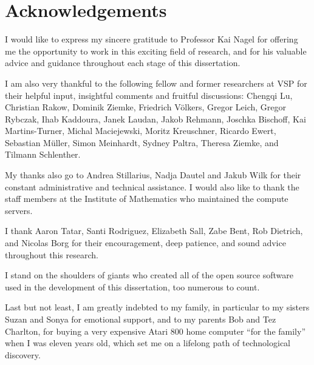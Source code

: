 
\thispagestyle{empty}

\chapter*{Acknowledgements}


I would like to express my sincere gratitude to Professor Kai Nagel for offering me the opportunity to work in this exciting field of research, and for his valuable advice and guidance throughout each stage of this dissertation.

I am also very thankful to the following fellow and former researchers at VSP for their helpful input, insightful comments and fruitful discussions:
Chengqi Lu,
Christian Rakow,
Dominik Ziemke,
Friedrich Völkers,
Gregor Leich,
Gregor Rybczak,
Ihab Kaddoura,
Janek Laudan,
Jakob Rehmann,
Joschka Bischoff,
Kai Martins-Turner,
Michal Maciejewski,
Moritz Kreuschner,
Ricardo Ewert,
Sebastian Müller,
Simon Meinhardt,
Sydney Paltra,
Theresa Ziemke,
and Tilmann Schlenther.

My thanks also go to Andrea Stillarius, Nadja Dautel and Jakub Wilk for their constant administrative and technical assistance. I would also like to thank the staff members at the Institute of Mathematics who maintained the compute servers.

I thank Aaron Tatar, Santi Rodriguez, Elizabeth Sall, Zabe Bent, Rob Dietrich, and Nicolas Borg for their encouragement, deep patience, and sound advice throughout this research.

I stand on the shoulders of giants who created all of the open source software used in the development of this dissertation, too numerous to count.

Last but not least, I am greatly indebted to my family, in particular to my sisters Suzan and Sonya for emotional support, and to my parents Bob and Tez Charlton, for buying a very expensive Atari 800 home computer ``for the family'' when I was eleven years old, which set me on a lifelong path of technological discovery.

\newpage
